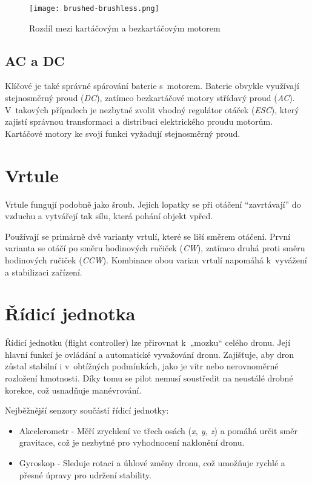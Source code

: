 \documentclass[12pt]{report}
\begin{document}
\begin{figure}[H]
	\centering
	\texttt{[image: brushed-brushless.png]}
	\caption{Rozdíl mezi kartáčovým a bezkartáčovým motorem \cite{rozum}}
	\label{fig:brushed-brushless.png}
  \end{figure}

\subsection[AC a DC]{AC a DC}
Klíčové je také správné spárování baterie s~motorem. Baterie obvykle využívají stejnosměrný proud (\textit{DC}), zatímco bezkartáčové motory střídavý proud (\textit{AC}). V~takových případech je nezbytné zvolit vhodný regulátor otáček (\textit{ESC}), který zajistí správnou transformaci a distribuci elektrického proudu motorům. Kartáčové motory ke svojí funkci vyžadují stejnosměrný proud. \cite{mainbook} \cite{dojo} \cite{ultimateguide} \cite{motors}

\section[Vrtule]{Vrtule}

Vrtule fungují podobně jako šroub. Jejich lopatky se při otáčení “zavrtávají” do vzduchu a vytvářejí tak sílu, která pohání objekt vpřed.

Používají se primárně dvě varianty vrtulí, které se liší směrem otáčení. První varianta se otáčí po směru hodinových ručiček (\textit{CW}), zatímco druhá proti směru hodinových ručiček (\textit{CCW}). Kombinace obou varian vrtulí napomáhá k~vyvážení a stabilizaci zařízení. \cite{mainbook} \cite{dojo}

\section[Řídicí jednotka]{Řídicí jednotka}

Řídicí jednotku (flight controller) lze přirovnat k~„mozku“ celého dronu. Její hlavní funkcí je ovládání a automatické vyvažování dronu. Zajišťuje, aby dron zůstal stabilní i v~obtížných podmínkách, jako je vítr nebo nerovnoměrné rozložení hmotnosti. Díky tomu se pilot nemusí soustředit na neustálé drobné korekce, což usnadňuje manévrování.

Nejběžnější senzory součástí řídicí jednotky:
\begin{itemize}
	\item Akcelerometr -  Měří zrychlení ve třech osách (\textit{x, y, z}) a pomáhá určit směr gravitace, což je nezbytné pro vyhodnocení naklonění dronu.
	\item Gyroskop - Sleduje rotaci a úhlové změny dronu, což umožňuje rychlé a přesné úpravy pro udržení stability.
\end{itemize}
\end{document}
